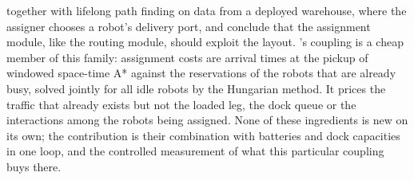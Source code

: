 together with lifelong path finding on data from a deployed warehouse, where
the assigner chooses a robot's delivery port, and conclude that the
assignment module, like the routing module, should exploit the layout.
\sname's coupling is a cheap member of this family: assignment costs are
arrival times at the pickup of windowed space-time A* against the
reservations of the robots that are already busy, solved jointly for all
idle robots by the Hungarian method. It prices the traffic that already
exists but not the loaded leg, the dock queue or the interactions among the
robots being assigned. None of these ingredients is new on its own; the
contribution is their combination with batteries and dock capacities in one
loop, and the controlled measurement of what this particular coupling buys
there.
